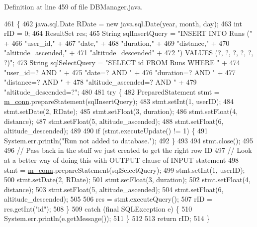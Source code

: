 Definition at line 459 of file D\+B\+Manager.\+java.


\begin{DoxyCode}
461                                                           \{
462         java.sql.Date RDate = \textcolor{keyword}{new} java.sql.Date(year, month, day);
463         \textcolor{keywordtype}{int} rID = 0;
464         ResultSet res;
465         String sqlInsertQuery = \textcolor{stringliteral}{"INSERT INTO Runs ("} +
466                 \textcolor{stringliteral}{"user\_id,"} +
467                 \textcolor{stringliteral}{"date,"} +
468                 \textcolor{stringliteral}{"duration,"} +
469                 \textcolor{stringliteral}{"distance,"} +
470                 \textcolor{stringliteral}{"altitude\_ascended,"} +
471                 \textcolor{stringliteral}{"altitude\_descended"} +
472                 \textcolor{stringliteral}{") VALUES (?, ?, ?, ?, ?, ?)"};
473         String sqlSelectQuery = \textcolor{stringliteral}{"SELECT id FROM Runs WHERE "} +
474                 \textcolor{stringliteral}{"user\_id=? AND "} +
475                 \textcolor{stringliteral}{"date=? AND "} +
476                 \textcolor{stringliteral}{"duration=? AND "} +
477                 \textcolor{stringliteral}{"distance=? AND "} +
478                 \textcolor{stringliteral}{"altitude\_ascended=? AND "} +
479                 \textcolor{stringliteral}{"altitude\_descended=?"};
480 
481         \textcolor{keywordflow}{try} \{
482             PreparedStatement stmt = \hyperlink{classcom_1_1activitytracker_1_1_d_b_manager_a064088d13ac09eb147fdc19268771521}{m\_conn}.prepareStatement(sqlInsertQuery);
483             stmt.setInt(1, userID);
484             stmt.setDate(2, RDate);
485             stmt.setFloat(3, duration);
486             stmt.setFloat(4, distance);
487             stmt.setFloat(5, altitude\_ascended);
488             stmt.setFloat(6, altitude\_descended);
489 
490             \textcolor{keywordflow}{if} (stmt.executeUpdate() != 1) \{
491                 System.err.println(\textcolor{stringliteral}{"Run not added to database."});
492             \}
493 
494             stmt.close();
495 
496             \textcolor{comment}{// Pass back in the stuff we just created to get the right row ID}
497             \textcolor{comment}{// Look at a better way of doing this with OUTPUT clause of INPUT statement}
498             stmt = \hyperlink{classcom_1_1activitytracker_1_1_d_b_manager_a064088d13ac09eb147fdc19268771521}{m\_conn}.prepareStatement(sqlSelectQuery);
499             stmt.setInt(1, userID);
500             stmt.setDate(2, RDate);
501             stmt.setFloat(3, duration);
502             stmt.setFloat(4, distance);
503             stmt.setFloat(5, altitude\_ascended);
504             stmt.setFloat(6, altitude\_descended);
505 
506             res = stmt.executeQuery();
507             rID = res.getInt(\textcolor{stringliteral}{"id"});
508         \}
509         \textcolor{keywordflow}{catch} (\textcolor{keyword}{final} SQLException e) \{
510             System.err.println(e.getMessage());
511         \}
512 
513         \textcolor{keywordflow}{return} rID;
514     \}
\end{DoxyCode}

